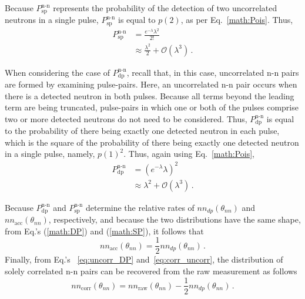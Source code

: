 Because $P^{\text{n-n}}_{\text{sp}}$ represents the probability of the detection of two uncorrelated neutrons in a single pulse, $P^{\text{n-n}}_{\text{sp}}$ is equal to $p(2)$, as per Eq.~\ref{math:Pois}.
Thus, 
\begin{equation} \label{math:SP}
    \begin{split}
    P^{\text{n-n}}_{\text{sp}} & = \frac{e^{-\lambda}\lambda^{2}}{2!} \\
        &\approx \frac{\lambda^2}{{2}} + \mathcal{O}(\lambda^3) \, .
    \end{split}
\end{equation}

When considering the case of $P^{\text{n-n}}_{\text{dp}}$, recall that, in this case, uncorrelated n-n pairs are formed by examining pulse-pairs.
Here, an uncorrelated n-n pair occurs when there is a detected neutron in both pulses.
Because all terms beyond the leading term are being truncated, pulse-pairs in which one or both of the pulses comprise two or more detected neutrons do not need to be considered.
Thus, $P^{\text{n-n}}_{\text{dp}}$ is equal to the probability of there being exactly one detected neutron in each pulse, which is the square of the probability of there being exactly one detected neutron in a single pulse, namely, $p(1)^2$. %
Thus, again using Eq.~\ref{math:Pois},
\begin{equation} \label{math:DP}
    \begin{split}
  P^{\text{n-n}}_{\text{dp}}&= \left(e^{-\lambda}\lambda\right)^{2} \\
    &\approx \lambda^2 + \mathcal{O}(\lambda^3) \, .
    \end{split}
\end{equation}

Because $P^{\text{n-n}}_{\text{dp}}$ and $P^{\text{n-n}}_{\text{sp}}$ determine the relative rates of $nn_{dp}(\theta_{nn})$ and $nn_{\text{acc}}(\theta_{nn})$, respectively, and because the two distributions have the same shape, from Eq.'s (\ref{math:DP}) and (\ref{math:SP}), it follows that
\begin{equation}
\label{eq:uncorr_DP}
nn_{\text{acc}}(\theta_{nn}) = \frac{1}{2}nn_{dp}(\theta_{nn}) \,.
\end{equation}
Finally, from Eq.'s ~\ref{eq:uncorr_DP} and~\ref{eq:corr_uncorr}, the distribution of solely correlated n-n pairs can be recovered from the raw measurement as follows
\begin{equation}
\label{math:acc_final}
nn_{\text{corr}}(\theta_{nn}) = nn_{\text{raw}}(\theta_{nn}) - \frac{1}{2}nn_{dp}(\theta_{nn}) \,.
\end{equation}
